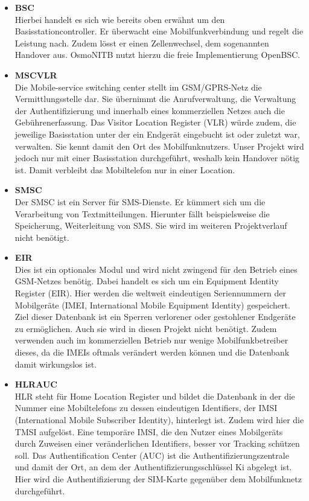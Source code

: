 \begin{itemize}

\item \textbf{BSC}\\
Hierbei handelt es sich wie bereits oben erwähnt um den Basisstationcontroller. Er überwacht eine Mobilfunkverbindung und regelt die Leistung nach. Zudem lösst er einen Zellenwechsel, dem sogenannten Handover aus. OsmoNITB nutzt hierzu die freie Implementierung OpenBSC.  

 
\item \textbf{MSC\/VLR}\\
Die Mobile-service switching center stellt im GSM/GPRS-Netz die Vermittlungsstelle dar. Sie übernimmt die Anrufverwaltung, die Verwaltung der Authentifizierung und innerhalb eines kommerziellen Netzes auch die Gebührenerfassung. Das Visitor Location Register (VLR) würde zudem, die jeweilige Basisstation unter der ein Endgerät eingebucht ist oder zuletzt war, verwalten. Sie kennt damit den Ort des Mobilfunknutzers. Unser Projekt wird jedoch nur mit einer Basisstation durchgeführt, weshalb kein Handover nötig ist. Damit verbleibt das Mobiltelefon nur in einer Location. 


\item \textbf{SMSC}\\
Der SMSC ist ein Server für SMS-Dienste. Er kümmert sich um die Verarbeitung von Textmitteilungen. Hierunter fällt beispielsweise die Speicherung, Weiterleitung von SMS. Sie wird im weiteren Projektverlauf nicht benötigt.


\item \textbf{EIR}\\
Dies ist ein optionales Modul und wird nicht zwingend für den Betrieb eines GSM-Netzes benötig. Dabei handelt es sich um ein Equipment Identity Register (EIR). Hier werden die weltweit eindeutigen Seriennummern der Mobilgeräte (IMEI, International Mobile Equipment Identity) gespeichert. Ziel dieser Datenbank ist ein Sperren verlorener oder gestohlener Endgeräte zu ermöglichen. Auch sie wird in diesen Projekt nicht benötigt. Zudem verwenden auch im kommerziellen Betrieb nur wenige Mobilfunkbetreiber dieses, da die IMEIs oftmals verändert werden können und die Datenbank damit wirkungslos ist.  


\item \textbf{HLR\/AUC}\\
HLR steht für Home Location Register und bildet die Datenbank in der die Nummer eine Mobiltelefons zu dessen eindeutigen Identifiers, der IMSI (International Mobile Subscriber Identity), hinterlegt ist. Zudem wird hier die TMSI aufgelöst. Eine temporäre IMSI, die den Nutzer eines Mobilgeräts durch Zuweisen einer veränderlichen Identifiers, besser vor Tracking schützen soll. Das Authentification Center (AUC) ist die Authentifizierungszentrale und damit der Ort, an dem der Authentifizierungsschlüssel Ki abgelegt ist. Hier wird die Authentifizierung der SIM-Karte gegenüber dem Mobilfunknetz durchgeführt. 


\end{itemize}


